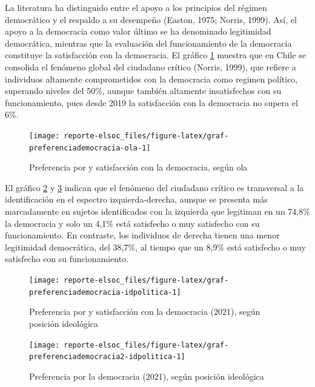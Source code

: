 \documentclass[
  12pt,
]{book}
\begin{document}
La literatura ha distinguido entre el apoyo a los principios del régimen democrático y el respaldo a su desempeño (Easton, 1975; Norris, 1999). Así, el apoyo a la democracia como valor último se ha denominado legitimidad democrática, mientras que la evaluación del funcionamiento de la democracia constituye la satisfacción con la democracia. El gráfico \ref{fig:graf-preferenciademocracia-ola} muestra que en Chile se consolida el fenómeno global del ciudadano crítico (Norris, 1999), que refiere a individuos altamente comprometidos con la democracia como regimen político, superando niveles del 50\%, aunque también altamente insatisfechos con su funcionamiento, pues desde 2019 la satisfacción con la democracia no supera el 6\%.

\begin{figure}

{\centering \texttt{[image: reporte-elsoc\_files/figure-latex/graf-preferenciademocracia-ola-1]} 

}

\caption{Preferencia por y satisfacción con la democracia, según ola}\label{fig:graf-preferenciademocracia-ola}
\end{figure}

El gráfico \ref{fig:graf-preferenciademocracia-idpolitica} y \ref{fig:graf-preferenciademocracia2-idpolitica} indican que el fenómeno del ciudadano crítico es transversal a la identificación en el espectro izquierda-derecha, aunque se presenta más marcadamente en sujetos identificados con la izquierda que legitiman en un 74,8\% la democracia y solo un 4,1\% está satisfecho o muy satisfecho con su funcionamiento. En contraste, los individuos de derecha tienen una menor legitimidad democrática, del 38,7\%, al tiempo que un 8,9\% está satisfecho o muy satisfecho con su funcionamiento.

\begin{figure}

{\centering \texttt{[image: reporte-elsoc\_files/figure-latex/graf-preferenciademocracia-idpolitica-1]} 

}

\caption{Preferencia por y satisfacción con la democracia (2021), según posición ideológica}\label{fig:graf-preferenciademocracia-idpolitica}
\end{figure}

\begin{figure}

{\centering \texttt{[image: reporte-elsoc\_files/figure-latex/graf-preferenciademocracia2-idpolitica-1]} 

}

\caption{Preferencia por la democracia (2021), según posición ideológica}\label{fig:graf-preferenciademocracia2-idpolitica}
\end{figure}
\end{document}
